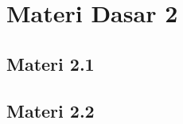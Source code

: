 \section{Materi Dasar 2}
		\paragraph*{} \lipsum[3]\cite{zz2}
		\subsection{Materi 2.1}
		\lipsum[9]
\subsection{Materi 2.2}
\lipsum[2]